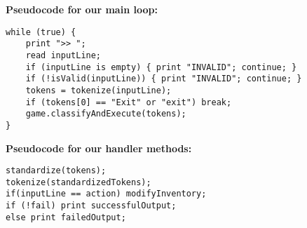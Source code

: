 \documentclass[a4paper,12pt]{article}
\begin{document}
\vspace{0.5em}
\textbf{Pseudocode for our main loop:}
\begin{verbatim}
while (true) {
    print ">> ";
    read inputLine;
    if (inputLine is empty) { print "INVALID"; continue; }
    if (!isValid(inputLine)) { print "INVALID"; continue; }
    tokens = tokenize(inputLine);
    if (tokens[0] == "Exit" or "exit") break;
    game.classifyAndExecute(tokens);
}
\end{verbatim}
\vspace{0.5em}
\textbf{Pseudocode for our handler methods:}
\begin{verbatim}
standardize(tokens);
tokenize(standardizedTokens);
if(inputLine == action) modifyInventory;
if (!fail) print successfulOutput;
else print failedOutput;
\end{verbatim}
\end{document}
